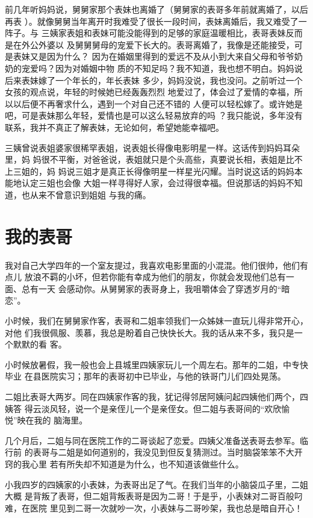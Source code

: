 \documentclass[12pt]{book}
\begin{document}
前几年听妈妈说，舅舅家那个表妹也离婚了（舅舅家的表哥多年前就离婚了，以后再表
）。就像舅舅当年离开时我难受了很长一段时间，表妹离婚后，我又难受了一阵子。与
三姨家表姐和表妹可能没能得到的足够的家庭温暖相比，表哥表妹反而是在外公外婆以
及舅舅舅母的宠爱下长大的。表哥离婚了，我像是还能接受，可是表妹又是因为什么？
因为在婚姻里得到的爱远不及从小到大来自父母和爷爷奶奶的宠爱吗？因为对婚姻中物
质的不知足吗？我不知道，我也想不明白。妈妈说后来表妹嫁了一个年长的，年长表妹
多少，妈妈没说，我也没问。之前听过一个女孩的观点说，年轻的时候她已经轰轰烈烈
地爱过了，体会过了爱情的幸福，所以以后便不再奢求什么，遇到一个对自己还不错的
人便可以轻松嫁了。或许她是吧，可是表妹那么年轻，爱情也是可以这么轻易放弃的吗
？我只能说，多年没有联系，我并不真正了解表妹，无论如何，希望她能幸福吧。

三姨曾说表姐婆家很稀罕表姐，说表姐长得像电影明星一样。这话传到妈妈耳朵里，妈
妈很不平衡，对爸爸说，表姐就只是个头高些，真要说长相，表姐是比不上三姐的，妈
妈说三姐才是真正长得像明星一样星光闪耀。当时说这话的妈妈本能地认定三姐也会像
大姐一样寻得好人家，会过得很幸福。但说那话的妈妈不知道，也从来不曾意识到姐姐
与我的痛。
\section{我的表哥}
\label{sec-9-21}

我对自己大学四年的一个室友提过，我喜欢电影里面的小混混。他们很帅，他们有点儿
放浪不羁的小坏，但若你能有幸成为他们的朋友，你就会发现他们总有一面、总有一天
会感动你。从舅舅家的表哥身上，我咀嚼体会了穿透岁月的“暗恋”。

小时候，我们在舅舅家作客，表哥和二姐率领我们一众姊妹一直玩儿得非常开心，对他
们我很佩服、羡慕，我总是盼着自己快快长大。我的话从来不多，我只是一个默默的看
客。

小时候放暑假，我一般也会上县城里四姨家玩儿一个周左右。那年的二姐，中专快毕业
在县医院实习；那年的表哥初中已毕业，与他的铁哥门儿们四处晃荡。

二姐比表哥大两岁。同在四姨家作客的我，犹记得邻居阿姨问起四姨他们两个，四姨答
得云淡风轻，说一个是亲侄儿一个是亲侄女。但二姐与表哥间的“欢欣愉悦”映在我的
脑海里。

几个月后，二姐与同在医院工作的二哥谈起了恋爱。四姨父准备送表哥去参军。临行前
的表哥与二姐是如何道别的，我没见到但反复猜测过。当时脑袋笨笨不大开窍的我心里
若有所失却不知道是为什么，也不知道该做些什么。

小我四岁的四姨家的小表妹，为表哥出足了气。在我们当年的小脑袋瓜子里，二姐大概
是背叛了表哥，但二姐背叛表哥是因为二哥！于是乎，小表妹对二哥百般叼难，在医院
里见到二哥一次就吵一次，小表妹与二哥吵架，我也总是暗自开心！
\end{document}
